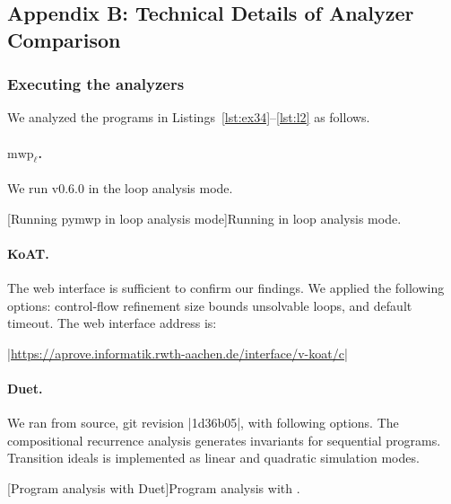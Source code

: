 \subsection{Appendix B: Technical Details of Analyzer Comparison}
\label{app:sec:comparison}

\subsubsection{Executing the analyzers}\label{subsec:analyzers}

We analyzed the programs in Listings~\ref{lst:ex34}--\ref{lst:l2} as follows.

\paragraph*{$\text{mwp}_\ell$.}
We run  v0.6.0 in the loop analysis mode.
\begin{center}
\begin{minipage}{\textwidth}
\captionsetup{type=lstlisting}
[Running pymwp in loop analysis mode]{Running  in loop analysis mode.}
\label{lst:mwp-bash}
\end{minipage}
\end{center}

\paragraph*{KoAT.}
The  web interface is sufficient to confirm our findings.
We applied the following options:
\myok{ }control-flow refinement
\myok{ }size bounds
\myok{ }unsolvable loops, and default timeout.
The web interface address is:

\begin{center}
\href{https://aprove.informatik.rwth-aachen.de/interface/v-koat/c}%
{\pr|https://aprove.informatik.rwth-aachen.de/interface/v-koat/c|}
\end{center}

\paragraph*{Duet.}
We ran  from source, git revision \pr|1d36b05|, with following options.
The compositional recurrence analysis generates invariants for sequential programs.
Transition ideals is implemented as linear and quadratic simulation modes.
\begin{center}
\begin{minipage}{\textwidth}
\captionsetup{type=lstlisting}
[Program analysis with Duet]{Program analysis with .}
\label{lst:duet-bash}
\end{minipage}
\end{center}

